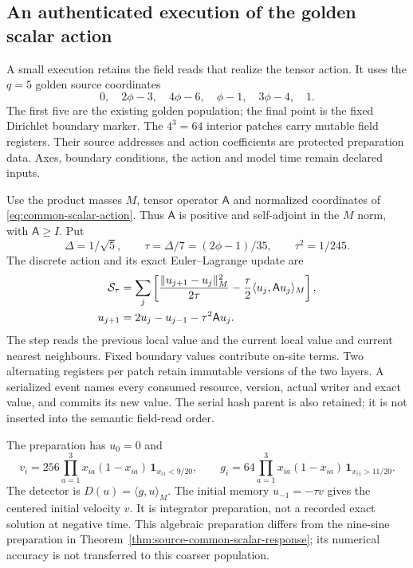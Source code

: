 \subsection{An authenticated execution of the golden scalar action}
\label{sec:source-scalar-execution}

A small execution retains the field reads that realize the tensor action.
It uses the $q=5$ golden source coordinates
\[
 0,\quad 2\phi-3,\quad4\phi-6,\quad\phi-1,\quad3\phi-4,\quad1.
\]
The first five are the existing golden population; the final point is the
fixed Dirichlet boundary marker. The $4^3=64$ interior patches carry mutable
field registers. Their source addresses and action coefficients are protected
preparation data. Axes, boundary conditions, the action and model time remain
declared inputs.

Use the product masses $M$, tensor operator $\mathsf A$ and normalized
coordinates of \eqref{eq:common-scalar-action}. Thus
$\mathsf A$ is positive and self-adjoint in the $M$ norm, with
$\mathsf A\ge I$. Put
\[
 \Delta=1/\sqrt5,\qquad \tau=\Delta/7=(2\phi-1)/35,
 \qquad\tau^2=1/245.
\]
The discrete action and its exact Euler--Lagrange update are
\begin{align}
 \mathcal S_\tau&=\sum_j\left[
 \frac{\|u_{j+1}-u_j\|_M^2}{2\tau}
 -\frac\tau2\langle u_j,\mathsf A u_j\rangle_M\right],\notag\\
 u_{j+1}&=2u_j-u_{j-1}-\tau^2\mathsf A u_j.
 \label{eq:source-scalar-executed-update}
\end{align}
The step reads the previous local value and the current local value and
current nearest neighbours. Fixed boundary values contribute on-site terms.
Two alternating registers per patch retain immutable versions of the two
layers. A serialized event names every consumed resource, version, actual
writer and exact value, and commits its new value. The serial hash parent
is also retained; it is not inserted into the semantic field-read order.

The preparation has $u_0=0$ and
\[
 v_i=256\prod_{a=1}^3x_{ia}(1-x_{ia})\,
       \mathbf1_{x_{i1}<9/20},\qquad
 g_i=64\prod_{a=1}^3x_{ia}(1-x_{ia})\,
       \mathbf1_{x_{i1}>11/20}.
\]
The detector is $D(u)=\langle g,u\rangle_M$.
The initial memory $u_{-1}=-\tau v$ gives the centered initial velocity
$v$. It is integrator preparation, not a recorded exact solution at negative
time. This algebraic preparation differs from the nine-sine preparation in
Theorem~\ref{thm:source-common-scalar-response}; its numerical accuracy is
not transferred to this coarser population.

